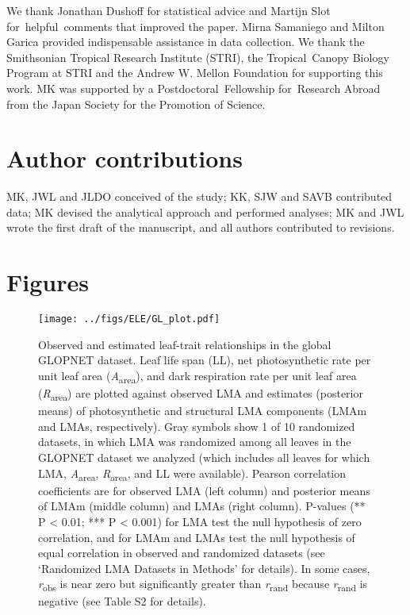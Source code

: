 \documentclass[12pt,]{article}
\let\oldsubparagraph\subparagraph
\renewcommand{\subparagraph}[1]{\oldsubparagraph{#1}\mbox{}}
\theoremstyle{definition}
\theoremstyle{definition}
\theoremstyle{definition}
\theoremstyle{remark}
\begin{document}
We thank Jonathan Dushoff for statistical advice and Martijn Slot
for~helpful~comments that improved the paper. Mirna Samaniego and Milton
Garica provided indispensable assistance in data collection. We thank
the Smithsonian Tropical Research Institute (STRI), the Tropical~Canopy
Biology Program at STRI and the Andrew W. Mellon Foundation for
supporting this work. MK was supported by a Postdoctoral~Fellowship
for~Research Abroad from the Japan Society for the Promotion of Science.

\hypertarget{author-contributions}{%
\section{Author contributions}\label{author-contributions}}

MK, JWL and JLDO conceived of the study; KK, SJW and SAVB contributed
data; MK devised the analytical approach and performed analyses; MK and
JWL wrote the first draft of the manuscript, and all authors contributed
to revisions.

\hypertarget{section-1}{%
\subparagraph{}\label{section-1}}

\section{Figures}

\begin{figure}
\centering
\texttt{[image: ../figs/ELE/GL\_plot.pdf]}
\caption{\label{fig:GL-plot}Observed and estimated leaf-trait relationships
in the global GLOPNET dataset. Leaf life span (LL), net photosynthetic
rate per unit leaf area (\emph{A}\textsubscript{area}), and dark
respiration rate per unit leaf area (\emph{R}\textsubscript{area}) are
plotted against observed LMA and estimates (posterior means) of
photosynthetic and structural LMA components (LMAm and LMAs,
respectively). Gray symbols show 1 of 10 randomized datasets, in which
LMA was randomized among all leaves in the GLOPNET dataset we analyzed
(which includes all leaves for which LMA, \emph{A}\textsubscript{area},
\emph{R}\textsubscript{area}, and LL were available). Pearson
correlation coefficients are for observed LMA (left column) and
posterior means of LMAm (middle column) and LMAs (right column).
P-values (** P \textless{} 0.01; *** P \textless{} 0.001) for LMA test
the null hypothesis of zero correlation, and for LMAm and LMAs test the
null hypothesis of equal correlation in observed and randomized datasets
(see `Randomized LMA Datasets in Methods' for details). In some cases,
\emph{r}\textsubscript{obs} is near zero but significantly greater than
\emph{r}\textsubscript{rand} because \emph{r}\textsubscript{rand} is
negative (see Table S2 for details).}
\end{figure}
\end{document}
